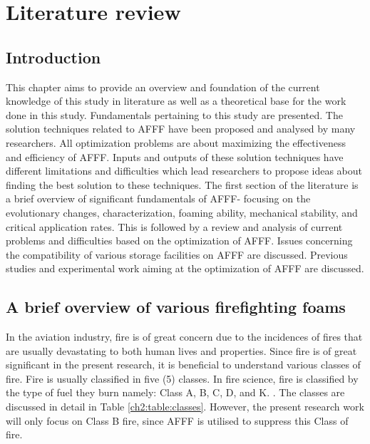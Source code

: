 \chapter{Literature review}
\section{Introduction}
This chapter aims to provide an overview and foundation of the current knowledge of this study in literature as well as a theoretical base for the work done in this study. Fundamentals pertaining to this study are presented. The solution techniques related to AFFF have been proposed and analysed by many researchers. All optimization problems are about maximizing the effectiveness and efficiency of AFFF. Inputs and outputs of these solution techniques have different limitations and difficulties which lead researchers to propose ideas about finding the best solution to these techniques.
The first section of the literature is a brief overview of significant fundamentals of AFFF- focusing on the evolutionary changes, characterization, foaming ability, mechanical stability, and critical application rates. This is followed by a review and analysis of current problems and difficulties based on the optimization of AFFF. Issues concerning the compatibility of various storage facilities on AFFF are discussed. Previous studies and experimental work aiming at the optimization of AFFF are discussed.

\section{A brief overview of various firefighting foams}
In the aviation industry, fire is of great concern due to the incidences of fires that are usually devastating to both human lives and properties. Since fire is of great significant in the present research, it is beneficial to understand various classes of fire. Fire is usually classified in five (5) classes. In fire science, fire is classified by the type of fuel they burn namely: Class A, B, C, D, and K. \cite{oguike2013study}.  The classes are discussed in detail in Table \ref{ch2:table:classes}. However, the present research work will only focus on Class B fire, since AFFF is utilised to suppress this Class of fire.

